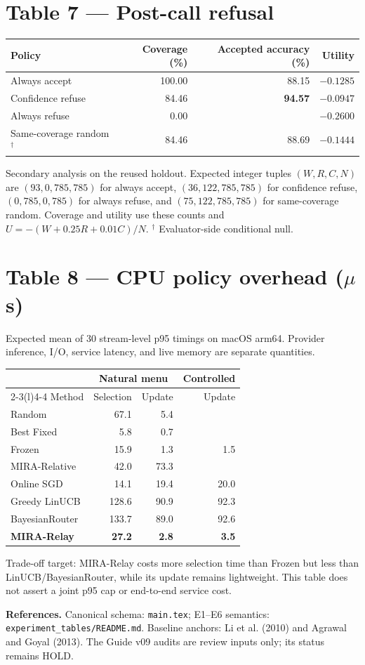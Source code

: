 \documentclass[10pt]{article}
\newcommand{\notrun}{\textemdash}
\newcommand{\smallnote}[1]{{\footnotesize\color{Gray}#1}}
\begin{document}
\section*{Table 7 --- Post-call refusal}
\begin{tabularx}{\linewidth}{@{}lrrr@{}}
\toprule
Policy & Coverage (\%) & Accepted accuracy (\%) & Utility \\
\midrule
Always accept & 100.00 & 88.15 & $-0.1285$ \\
Confidence refuse & 84.46 & \textbf{94.57} & $\mathbf{-0.0947}$ \\
Always refuse & 0.00 & \notrun & $-0.2600$ \\
\midrule
Same-coverage random$^{\dagger}$ & 84.46 & 88.69 & $-0.1444$ \\
\bottomrule
\end{tabularx}
\smallnote{Secondary analysis on the reused holdout. Expected integer tuples $(W,R,C,N)$ are $(93,0,785,785)$ for always accept, $(36,122,785,785)$ for confidence refuse, $(0,785,0,785)$ for always refuse, and $(75,122,785,785)$ for same-coverage random.}
\smallnote{Coverage and utility use these counts and $U=-(W+0.25R+0.01C)/N$. $^{\dagger}$ Evaluator-side conditional null.}

\clearpage
\section*{Table 8 --- CPU policy overhead ($\mu$s)}
\smallnote{Expected mean of 30 stream-level p95 timings on macOS arm64. Provider inference, I/O, service latency, and live memory are separate quantities.}
\begin{tabularx}{\linewidth}{@{}lrrr@{}}
\toprule
& \multicolumn{2}{c}{Natural menu} & Controlled \\
\cmidrule(lr){2-3}\cmidrule(l){4-4}
Method & Selection & Update & Update \\
\midrule
Random & 67.1 & 5.4 & \notrun \\
Best Fixed & 5.8 & 0.7 & \notrun \\
Frozen & 15.9 & 1.3 & 1.5 \\
MIRA-Relative & 42.0 & 73.3 & \notrun \\
\midrule
Online SGD & 14.1 & 19.4 & 20.0 \\
Greedy LinUCB & 128.6 & 90.9 & 92.3 \\
BayesianRouter & 133.7 & 89.0 & 92.6 \\
\textbf{MIRA-Relay} & \textbf{27.2} & \textbf{2.8} & \textbf{3.5} \\
\bottomrule
\end{tabularx}
\smallnote{Trade-off target: MIRA-Relay costs more selection time than Frozen but less than LinUCB/BayesianRouter, while its update remains lightweight. This table does not assert a joint p95 cap or end-to-end service cost.}

\vfill
\small
\textbf{References.}
Canonical schema: \texttt{main.tex}; E1--E6 semantics: \texttt{experiment\_tables/README.md}.
Baseline anchors: Li et al. (2010) and Agrawal and Goyal (2013). The Guide v09 audits are review inputs only; its status remains HOLD.
\end{document}
